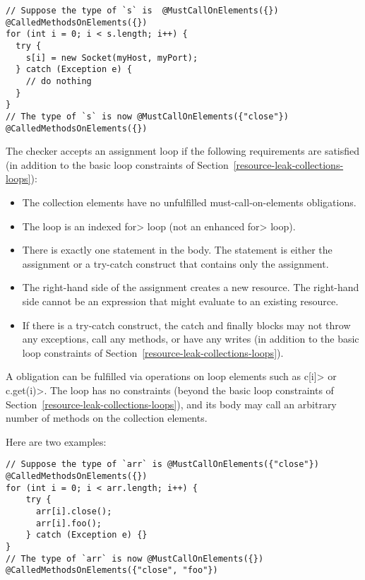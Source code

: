 \begin{Verbatim}
// Suppose the type of `s` is  @MustCallOnElements({}) @CalledMethodsOnElements({})
for (int i = 0; i < s.length; i++) {
  try {
    s[i] = new Socket(myHost, myPort);
  } catch (Exception e) {
    // do nothing
  }
}
// The type of `s` is now @MustCallOnElements({"close"}) @CalledMethodsOnElements({})
\end{Verbatim}

The checker accepts an assignment loop if the following requirements are
satisfied (in addition to the basic loop constraints of Section~\ref{resource-leak-collections-loops}):

\begin{itemize}
  \item The collection elements have no unfulfilled must-call-on-elements obligations.
  \item The loop is an indexed \<for> loop (not an enhanced \<for> loop).
  \item There is exactly one statement in the body. The statement is either the
    assignment or a try-catch construct that contains only the assignment.
  \item The right-hand side of the assignment creates a new resource.
    The right-hand side cannot be an expression that might evaluate to an existing resource.
  \item If there is a try-catch construct, the catch and finally blocks may
    not throw any exceptions, call any methods, or have any writes (in
    addition to the basic loop constraints of Section~\ref{resource-leak-collections-loops}).
\end{itemize}


A \MustCallOnElements obligation can be fulfilled via operations on loop
elements such as \<c[i]> or \<c.get(i)>.
The loop has no constraints (beyond the basic loop constraints of
Section~\ref{resource-leak-collections-loops}), and its body may call an
arbitrary number of methods on the collection elements.

Here are two examples:

\begin{verbatim}
// Suppose the type of `arr` is @MustCallOnElements({"close"}) @CalledMethodsOnElements({})
for (int i = 0; i < arr.length; i++) {
    try {
      arr[i].close();
      arr[i].foo();
    } catch (Exception e) {}
}
// The type of `arr` is now @MustCallOnElements({}) @CalledMethodsOnElements({"close", "foo"})
\end{verbatim}

